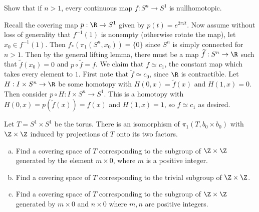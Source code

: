\documentclass[11pt,letterpaper]{article}
\begin{document}
\begin{problem}%
    Show that if $n>1$, every continuous map $f : S^n \to S^1$ is nullhomotopic. %
\end{problem}

\begin{solution}
    Recall the covering map $p : \R \to S^1$ given by $p(t)=e^{2\pi i t}$. Now assume without loss of generality that $f^{-1}(1)$ is nonempty (otherwise rotate the map), let $x_0\in f^{-1}(1)$. Then $f_*(\pi_1(S^n, x_0))=\{0\}$ since $S^n$ is simply connected for $n>1$. Then by the general lifting lemma, there must be a map $\widetilde{f} : S^n \to \R$ such that $\widetilde{f}(x_0)=0$ and $p\circ\widetilde{f}=f$. We claim that $f\simeq c_{1}$, the constant map which takes every element to $1$. First note that $\widetilde{f} \simeq c_{0}$, since $\R$ is contractible. Let $H : I\times S^n \to \R$ be some homotopy with $H(0,x)=\widetilde{f}(x)$ and $H(1,x)=0$. Then consider $p\circ H : I\times S^n \to S^1$. This is a homotopy with $H(0,x)=p(\widetilde{f}(x))=f(x)$ and $H(1,x)=1$, so $f\simeq c_{1}$ as desired.   
\end{solution}

\begin{problem}%
    Let $T=S^1\times S^1$ be the torus. There is an isomorphism of $\pi_1(T,b_0\times b_0)$ with $\Z\times \Z$ induced by projections of $T$ onto its two factors.
    \begin{enumerate}[(a)]
        \item Find a covering space of $T$ corresponding to the subgroup of $\Z\times \Z$ generated by the element $m\times 0$, where $m$ is a positive integer.
        \item Find a covering space of $T$ corresponding to the trivial subgroup of $\Z\times \Z$.
        \item Find a covering space of $T$ corresponding to the subgroup of $\Z\times \Z$ generated by $m\times 0$ and $n\times 0$ where $m,n$ are positive integers. 
    \end{enumerate} 
\end{problem}
\end{document}
